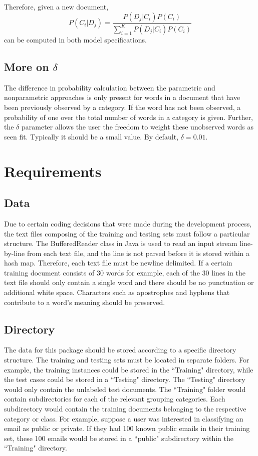 \documentclass[a4paper]{article}
\begin{document}
\noindent Therefore, given a new document,
$$P(C_i|D_j) = \frac{P(D_j|C_i)P(C_i)}{\sum_{i=1}^K P(D_j|C_i)P(C_i)}$$
can be computed in both model specifications.

\subsection{More on $\delta$}
The difference in probability calculation between the parametric and nonparametric approaches is only present for words in a document that have been previously observed by a category. If the word has not been observed, a probability of one over the total number of words in a category is given. Further, the $\delta$ parameter allows the user the freedom to weight these unobserved words as seen fit. Typically it should be a small value. By default, $\delta = 0.01$.

\section{Requirements}
\subsection{Data}
Due to certain coding decisions that were made during the development process, the text files composing of the training and testing sets must follow a particular structure. The BufferedReader class in Java is used to read an input stream line-by-line from each text file, and the line is not parsed before it is stored within a hash map. Therefore, each text file must be newline delimited. If a certain training document consists of 30 words for example, each of the 30 lines in the text file should only contain a single word and there should be no punctuation or additional white space. Characters such as apostrophes and hyphens that contribute to a word's meaning should be preserved. 
\subsection{Directory}
The data for this package should be stored according to a specific directory structure. The training and testing sets must be located in separate folders. For example, the training instances could be stored in the ``Training" directory, while the test cases could be stored in a ``Testing" directory. The ``Testing" directory would only contain the unlabeled test documents. The ``Training" folder would contain subdirectories for each of the relevant grouping categories. Each subdirectory would contain the training documents belonging to the respective category or class. For example, suppose a user was interested in classifying an email as public or private. If they had 100 known public emails in their training set, these 100 emails would be stored in a ``public" subdirectory within the ``Training" directory.
\end{document}
